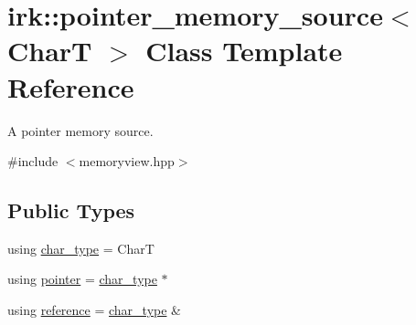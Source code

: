 \hypertarget{classirk_1_1pointer__memory__source}{}\section{irk\+:\+:pointer\+\_\+memory\+\_\+source$<$ CharT $>$ Class Template Reference}
\label{classirk_1_1pointer__memory__source}


A pointer memory source.  




{\ttfamily \#include $<$memoryview.\+hpp$>$}

\subsection*{Public Types}
\begin{DoxyCompactItemize}
\item 
using \mbox{\hyperlink{classirk_1_1pointer__memory__source_a4b778df8efee229fdafbd4de413dbf61}{char\+\_\+type}} = CharT
\item 
using \mbox{\hyperlink{classirk_1_1pointer__memory__source_aba722220e2243bb6ccc979f43ae159f6}{pointer}} = \mbox{\hyperlink{classirk_1_1pointer__memory__source_a4b778df8efee229fdafbd4de413dbf61}{char\+\_\+type}} $\ast$
\item 
using \mbox{\hyperlink{classirk_1_1pointer__memory__source_a6dd95b7b51c414d4fe531ee7375ac071}{reference}} = \mbox{\hyperlink{classirk_1_1pointer__memory__source_a4b778df8efee229fdafbd4de413dbf61}{char\+\_\+type}} \&
\end{DoxyCompactItemize}
